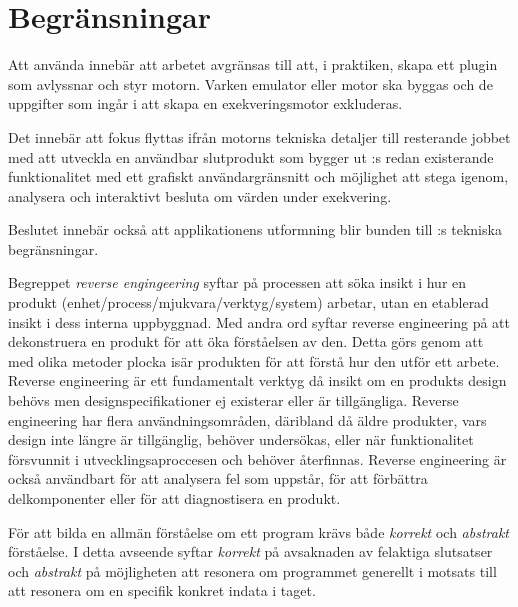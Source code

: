 \section{Begränsningar}

Att använda \stoe innebär att arbetet avgränsas till att, i praktiken, skapa
ett plugin som avlyssnar och styr motorn. Varken emulator eller motor ska
byggas och de uppgifter som ingår i att skapa en exekveringsmotor exkluderas.

Det innebär att fokus flyttas ifrån motorns tekniska detaljer till resterande
jobbet med att utveckla en användbar slutprodukt som bygger ut \stoe:s redan
existerande funktionalitet med ett grafiskt användargränsnitt och möjlighet att
stega igenom, analysera och interaktivt besluta om värden under exekvering.

Beslutet innebär också att applikationens utformning blir bunden till \stoe:s
tekniska begränsningar.

Begreppet \textit{reverse engingeering} syftar på processen att söka insikt i hur en produkt 
(enhet/process/mjukvara/verktyg/system) arbetar, utan en etablerad insikt i dess interna 
uppbyggnad. Med andra ord syftar reverse engineering på att dekonstruera en produkt för att 
öka förståelsen av den. Detta görs genom att med olika metoder plocka isär produkten för 
att förstå hur den utför ett arbete. Reverse engineering är ett fundamentalt verktyg då insikt 
om en produkts design behövs men designspecifikationer ej existerar eller är tillgängliga. 
Reverse engineering har flera användningsområden, däribland då äldre produkter, vars design 
inte längre är tillgänglig, behöver undersökas, eller när funktionalitet försvunnit i 
utvecklingsaproccesen och behöver återfinnas. Reverse engineering är också användbart för 
att analysera fel som uppstår, för att förbättra delkomponenter eller för att diagnostisera 
en produkt.

För att bilda en allmän förståelse om ett program krävs både \textit{korrekt} och
\textit{abstrakt} förståelse. I detta avseende syftar \textit{korrekt} på
avsaknaden av felaktiga slutsatser och \textit{abstrakt} på möjligheten att
resonera om programmet generellt i motsats till att resonera om en specifik
konkret indata i taget.
